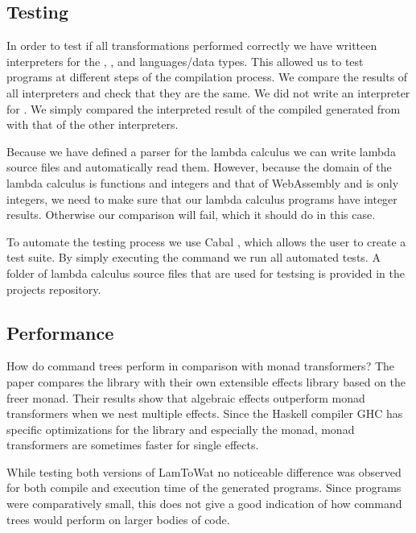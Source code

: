 \subsection{Testing}
In order to test if all transformations performed correctly we have writteen interpreters for the , , and  languages/data types. This allowed us to test programs at different steps of the compilation process. We compare the results of all interpreters and check that they are the same. We did not write an interpreter for . We simply compared the interpreted result of the compiled  generated from  with that of the other interpreters.

Because we have defined a parser for the lambda calculus we can write lambda source files and automatically read them. However, because the domain of the lambda calculus is functions and integers and that of WebAssembly and  is only integers, we need to make sure that our lambda calculus programs have integer results. Otherwise our comparison will fail, which it should do in this case.

To automate the testing process we use Cabal \autocite{haskellcabal}, which allows the user to create a test suite. By simply executing the  command we run all automated tests. A folder of lambda calculus source files that are used for testsing is provided in the projects repository.

\subsection{Performance}
How do command trees perform in comparison with monad transformers? The paper  \autocite{DBLP:conf/haskell/KiselyovI15} compares the  library with their own extensible effects library based on the freer monad. Their results show that algebraic effects outperform monad transformers when we nest multiple effects. Since the Haskell compiler GHC has specific optimizations for the  library and especially the  monad, monad transformers are sometimes faster for single effects.

While testing both versions of LamToWat no noticeable difference was observed for both compile and execution time of the generated programs. Since programs were comparatively small, this does not give a good indication of how command trees would perform on larger bodies of code.


